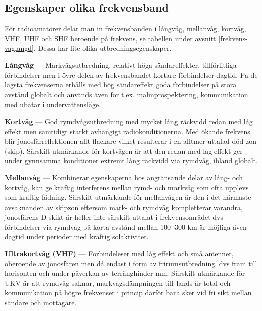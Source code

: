 \subsection{Egenskaper olika frekvensband}

För radioamatörer delar man in frekvensbanden i långvåg, mellanvåg, kortvåg, VHF, UHF och SHF beroende på frekvens, se tabellen under avsnitt \ref{frekvens-vaglangd}. Dessa har lite olika utbredningsegenskaper.

\textbf{Långvåg} --- Markvågsutbredning, relativt höga sändareffekter, tillförlitliga för\-bind\-el\-ser men i övre delen av frekvensbandet kortare förbindelser dagtid. På de lägsta frekvenserna erhålls med hög sändareffekt goda förbindelser på stora avstånd globalt och används även för t.ex. malmprospektering, kommunikation med ubåtar i undervattensläge.

\textbf{Kortvåg} --- God rymdvågsutbredning med mycket lång räckvidd redan med låg effekt men samtidigt starkt avhängigt radiokonditionerna. Med ökande frekvens blir jonosfärreflektionen allt flackare vilket resulterar i en alltmer uttalad död zon (skip). Särskilt utmärkande för kortvågen är att den redan med låg effekt ger under gynnsamma konditioner extremt lång räckvidd via rymdvåg, ibland globalt.

\textbf{Mellanvåg} --- Kombinerar egenskaperna hos angränsande delar av lång- och kortvåg, kan ge kraftig interferens mellan rymd- och markvåg som ofta upplevs som kraftig fädning. Särskilt utmärkande för mellanvågen är den i det närmaste avsaknanden av skipzon eftersom mark- och rymdvåg kompletterar varandra, jonosfärens D-skikt är heller inte särskilt uttalat i frekvensområdet dvs förbindelser via rymdvåg på korta avstånd mellan 100--300 km är möjliga även dagtid under perioder med kraftig solaktivitet.

\textbf{Ultrakortvåg (VHF)} --- Förbindeleser med låg effekt och små antenner, oberoende av jonosfären men då endast i form av frirumsutbredning, dvs fram till horisonten och under påverkan av terränghinder mm. Särskilt utmärkande för UKV är att rymdvåg saknar, markvågsdämpningen till lands är total och kommunikation på högre frekvenser i princip därför bara sker vid fri sikt mellan sändare och mottagare.

